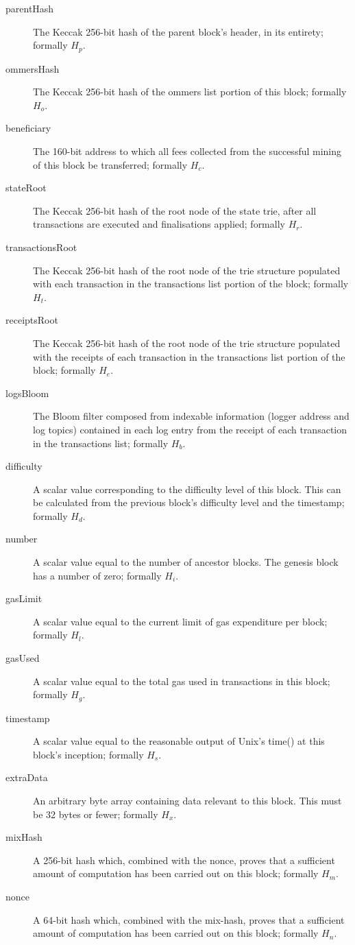 \documentclass[9pt,oneside]{amsart}
\begin{document}
\begin{multicols}{2}
\begin{description}
\item[parentHash] The Keccak 256-bit hash of the parent block's header, in its entirety; formally $H_p$.
\item[ommersHash] The Keccak 256-bit hash of the ommers list portion of this block; formally $H_o$.
\item[beneficiary] The 160-bit address to which all fees collected from the successful mining of this block be transferred; formally $H_c$.
\item[stateRoot] The Keccak 256-bit hash of the root node of the state trie, after all transactions are executed and finalisations applied; formally $H_r$.
\item[transactionsRoot] The Keccak 256-bit hash of the root node of the trie structure populated with each transaction in the transactions list portion of the block; formally $H_t$.
\item[receiptsRoot] The Keccak 256-bit hash of the root node of the trie structure populated with the receipts of each transaction in the transactions list portion of the block; formally $H_e$.
\item[logsBloom] The Bloom filter composed from indexable information (logger address and log topics) contained in each log entry from the receipt of each transaction in the transactions list; formally $H_b$.
\item[difficulty] A scalar value corresponding to the difficulty level of this block. This can be calculated from the previous block's difficulty level and the timestamp; formally $H_d$.
\item[number] A scalar value equal to the number of ancestor blocks. The genesis block has a number of zero; formally $H_i$.
\item[gasLimit] A scalar value equal to the current limit of gas expenditure per block; formally $H_l$.
\item[gasUsed] A scalar value equal to the total gas used in transactions in this block; formally $H_g$.
\item[timestamp] A scalar value equal to the reasonable output of Unix's time() at this block's inception; formally $H_s$.
\item[extraData] An arbitrary byte array containing data relevant to this block. This must be 32 bytes or fewer; formally $H_x$.
\item[mixHash] A 256-bit hash which, combined with the nonce, proves that a sufficient amount of computation has been carried out on this block; formally $H_m$.
\item[nonce] A 64-bit hash which, combined with the mix-hash, proves that a sufficient amount of computation has been carried out on this block; formally $H_n$.
\end{description}


\end{multicols}
\end{document}
